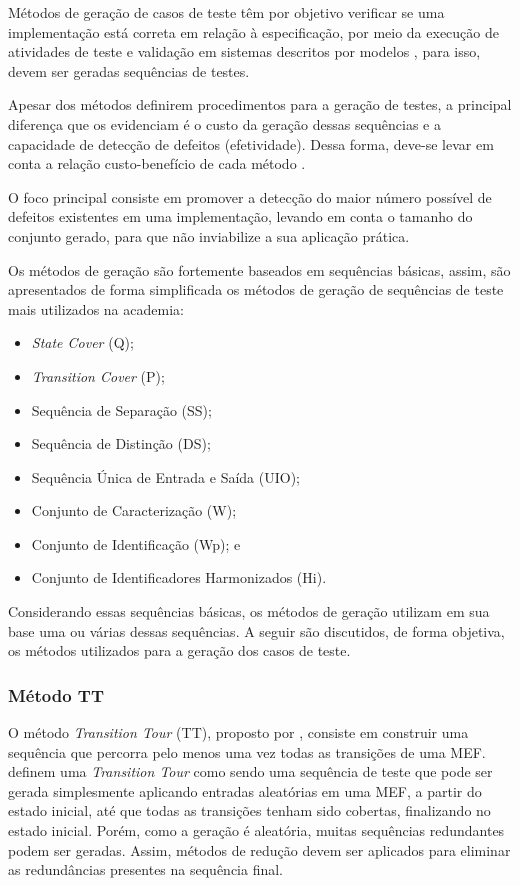 Métodos de geração de casos de teste têm por objetivo verificar se uma implementação está correta em relação à especificação, por meio da execução de atividades de teste e validação em sistemas descritos por modelos \cite{fujiwara1991test}, para isso, devem ser geradas sequências de testes.

Apesar dos métodos definirem procedimentos para a geração de testes, a principal diferença que os evidenciam é o custo da geração dessas sequências e a capacidade de detecção de defeitos (efetividade). Dessa  forma,  deve-se  levar  em  conta  a  relação  custo-benefício  de  cada  método \cite{pinheiro2012subsidios}. 

O foco principal consiste em promover a detecção do maior número possível de defeitos existentes em uma implementação, levando em conta o tamanho do conjunto gerado, para que não inviabilize a sua aplicação prática. 

Os métodos de geração são fortemente baseados em sequências básicas, assim, são apresentados de forma simplificada os métodos de geração de sequências de teste mais utilizados na academia:

\begin{itemize}
	\item \textit{State Cover} (Q);
	\item \textit{Transition Cover} (P);
	\item Sequência de Separação (SS);
	\item Sequência de Distinção (DS);
	\item Sequência Única de Entrada e Saída (UIO);
	\item Conjunto de Caracterização (W);
	\item Conjunto de Identificação (Wp); e
	\item Conjunto de Identificadores Harmonizados (Hi).
\end{itemize}

Considerando essas sequências básicas, os métodos de geração utilizam em sua base uma ou várias dessas sequências. A seguir são discutidos, de forma objetiva, os métodos utilizados para a geração dos casos de teste.

\subsubsection{Método TT}

O método  \textit{Transition Tour} (TT), proposto por \citet{naito1981fault}, consiste em construir uma sequência que percorra pelo menos uma vez todas as transições de uma MEF. \citet{sidhu1989formal} definem uma \textit{Transition Tour} como sendo uma sequência de teste que pode ser gerada simplesmente aplicando entradas aleatórias em uma MEF, a partir do estado inicial, até que todas as transições tenham sido cobertas, finalizando no estado inicial. Porém, como a geração é aleatória, muitas sequências redundantes podem ser geradas. Assim, métodos de redução devem ser aplicados para eliminar as redundâncias presentes na sequência final.

